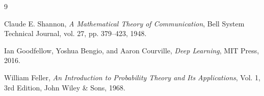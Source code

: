 \documentclass[12pt]{article}
\begin{document}
\renewcommand{\refname}{\color{emerald} Cited References}
\begin{thebibliography}{9}

Claude E. Shannon, \textit{A Mathematical Theory of Communication}, Bell System Technical Journal, vol. 27, pp. 379--423, 1948.

Ian Goodfellow, Yoshua Bengio, and Aaron Courville, \textit{Deep Learning}, MIT Press, 2016.

William Feller, \textit{An Introduction to Probability Theory and Its Applications}, Vol. 1, 3rd Edition, John Wiley \& Sons, 1968.

\end{thebibliography}
\end{document}
